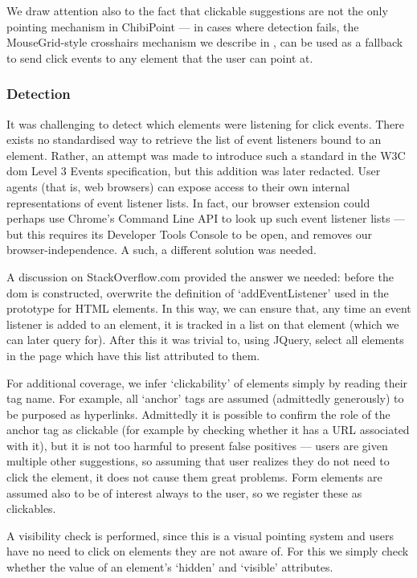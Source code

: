 \documentclass[11pt,openright,a4paper]{report}
\begin{document}
We draw attention also to the fact that clickable suggestions are not the only pointing mechanism in ChibiPoint --- in cases where detection fails, the MouseGrid-style crosshairs mechanism we describe in , can be used as a fallback to send click events to any element that the user can point at.

\subsubsection{Detection}
It was challenging to detect which elements were listening for click events. There exists no standardised way to retrieve the list of event listeners bound to an element. Rather, an attempt was made to introduce such a standard in the W3C \gls{dom} Level 3 Events specification\cite{dom3attempt}, but this addition was later redacted\cite{domlevel3}. User agents (that is, web browsers) can expose access to their own internal representations of event listener lists. In fact, our browser extension could perhaps use Chrome's Command Line API\cite{commandlineapi} to look up such event listener lists --- but this requires its Developer Tools Console to be open, and removes our browser-independence. A such, a different solution was needed.

A discussion on StackOverflow.com provided the answer we needed\cite{eventlistenerprototype}: before the \gls{dom} is constructed, overwrite the definition of `addEventListener' used in the prototype for HTML elements. In this way, we can ensure that, any time an event listener is added to an element, it is tracked in a list on that element (which we can later query for). After this it was trivial to, using JQuery, select all elements in the page which have this list attributed to them.

For additional coverage, we infer `clickability' of elements simply by reading their tag name. For example, all `anchor' tags are assumed (admittedly generously) to be purposed as hyperlinks. Admittedly it is possible to confirm the role of the anchor tag as clickable (for example by checking whether it has a URL associated with it), but it is not too harmful to present false positives --- users are given multiple other suggestions, so assuming that user realizes they do not need to click the element, it does not cause them great problems. Form elements are assumed also to be of interest always to the user, so we register these as clickables.

A visibility check is performed, since this is a visual pointing system and users have no need to click on elements they are not aware of. For this we simply check whether the value of an element's `hidden' and `visible' attributes.
\end{document}
